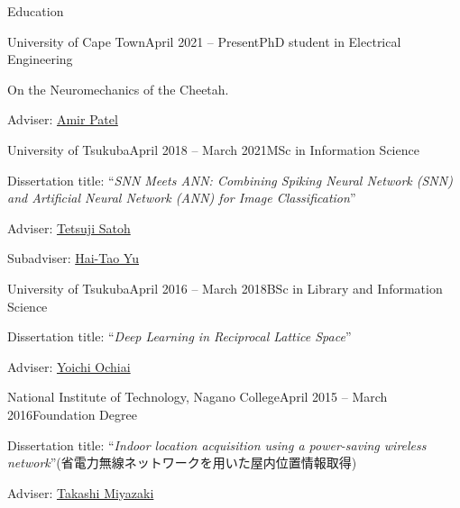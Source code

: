 \documentclass{resume} %
\begin{document}

\begin{rSection}{Education}

    \begin{rSubsection}{University of Cape Town}{April 2021 -- Present}{PhD student in Electrical Engineering}{}
    \item On the Neuromechanics of the Cheetah.
    \item Adviser: \href{https://scholar.google.co.za/citations?user=RxMigV4AAAAJ&view_op=list_works&sortby=pubdate}{Amir Patel}
    \end{rSubsection}

    \begin{rSubsection}{University of Tsukuba}{April 2018 -- March 2021}{MSc in Information Science}{}
    \item Dissertation title: ``{\it SNN Meets ANN: Combining Spiking Neural Network (SNN) and Artificial Neural Network (ANN) for Image Classification}''
    \item Adviser: \href{http://www.slis.tsukuba.ac.jp/~satoh.tetsuji.gf/index.html}{Tetsuji Satoh}
    \item Subadviser: \href{https://scholar.google.co.jp/citations?user=88b2NRsAAAAJ&hl=ja}{Hai-Tao Yu}
    \end{rSubsection}

    \begin{rSubsection}{University of Tsukuba}{April 2016 -- March 2018}{BSc in Library and Information Science}{}
    \item Dissertation title: ``{\it Deep Learning in Reciprocal Lattice Space}''
    \item Adviser: \href{https://scholar.google.co.jp/citations?user=obhH0jkAAAAJ&hl=en}{Yoichi Ochiai}
    \end{rSubsection}

    \begin{rSubsection}{National Institute of Technology, Nagano College}{April 2015 -- March 2016}{Foundation Degree}{}
    \item Dissertation title: ``{\it Indoor location acquisition using a power-saving wireless network}''(省電力無線ネットワークを用いた屋内位置情報取得)
    \item Adviser: \href{https://researchmap.jp/read0178034?lang=en}{Takashi Miyazaki}
    \end{rSubsection}

\end{rSection}
\end{document}
